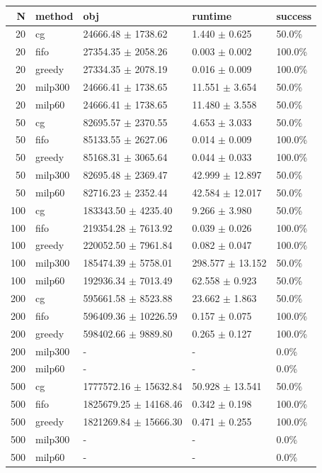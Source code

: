 \begin{tabular}{rllll}
\toprule
N & method & obj & runtime & success \\
\midrule
20 & cg & 24666.48 $\pm$ 1738.62 & 1.440 $\pm$ 0.625 & 50.0\% \\
20 & fifo & 27354.35 $\pm$ 2058.26 & 0.003 $\pm$ 0.002 & 100.0\% \\
20 & greedy & 27334.35 $\pm$ 2078.19 & 0.016 $\pm$ 0.009 & 100.0\% \\
20 & milp300 & 24666.41 $\pm$ 1738.65 & 11.551 $\pm$ 3.654 & 50.0\% \\
20 & milp60 & 24666.41 $\pm$ 1738.65 & 11.480 $\pm$ 3.558 & 50.0\% \\
50 & cg & 82695.57 $\pm$ 2370.55 & 4.653 $\pm$ 3.033 & 50.0\% \\
50 & fifo & 85133.55 $\pm$ 2627.06 & 0.014 $\pm$ 0.009 & 100.0\% \\
50 & greedy & 85168.31 $\pm$ 3065.64 & 0.044 $\pm$ 0.033 & 100.0\% \\
50 & milp300 & 82695.48 $\pm$ 2369.47 & 42.999 $\pm$ 12.897 & 50.0\% \\
50 & milp60 & 82716.23 $\pm$ 2352.44 & 42.584 $\pm$ 12.017 & 50.0\% \\
100 & cg & 183343.50 $\pm$ 4235.40 & 9.266 $\pm$ 3.980 & 50.0\% \\
100 & fifo & 219354.28 $\pm$ 7613.92 & 0.039 $\pm$ 0.026 & 100.0\% \\
100 & greedy & 220052.50 $\pm$ 7961.84 & 0.082 $\pm$ 0.047 & 100.0\% \\
100 & milp300 & 185474.39 $\pm$ 5758.01 & 298.577 $\pm$ 13.152 & 50.0\% \\
100 & milp60 & 192936.34 $\pm$ 7013.49 & 62.558 $\pm$ 0.923 & 50.0\% \\
200 & cg & 595661.58 $\pm$ 8523.88 & 23.662 $\pm$ 1.863 & 50.0\% \\
200 & fifo & 596409.36 $\pm$ 10226.59 & 0.157 $\pm$ 0.075 & 100.0\% \\
200 & greedy & 598402.66 $\pm$ 9889.80 & 0.265 $\pm$ 0.127 & 100.0\% \\
200 & milp300 & - & - & 0.0\% \\
200 & milp60 & - & - & 0.0\% \\
500 & cg & 1777572.16 $\pm$ 15632.84 & 50.928 $\pm$ 13.541 & 50.0\% \\
500 & fifo & 1825679.25 $\pm$ 14168.46 & 0.342 $\pm$ 0.198 & 100.0\% \\
500 & greedy & 1821269.84 $\pm$ 15666.30 & 0.471 $\pm$ 0.255 & 100.0\% \\
500 & milp300 & - & - & 0.0\% \\
500 & milp60 & - & - & 0.0\% \\
\bottomrule
\end{tabular}
